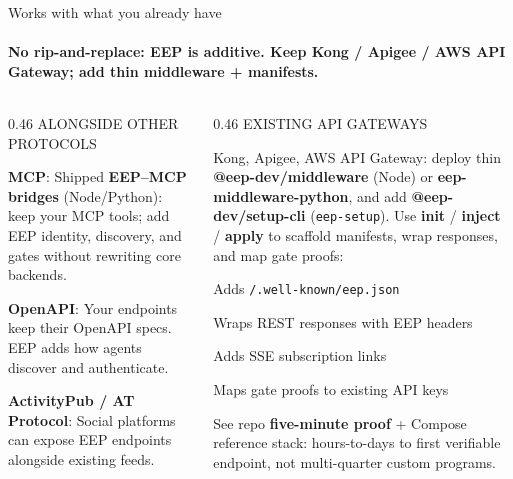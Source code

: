 \documentclass[aspectratio=169,10pt]{beamer}
\newcommand{\cmark}{\textcolor{mint}{\ding{51}}}
\begin{document}
\begin{frame}{Works with what you already have}
\framesubtitle{No rip-and-replace: EEP is \textbf{additive}. Keep Kong / Apigee / AWS API Gateway; add thin middleware + manifests.}

\vspace{0.12cm}

\begin{columns}[T]
\begin{column}{0.46\textwidth}
{\footnotesize\color{accent} ALONGSIDE OTHER PROTOCOLS}\par
\vspace{4pt}
{\footnotesize\color{txtm}%
\textbf{MCP}: Shipped \textbf{EEP--MCP bridges} (Node/Python): keep your MCP tools; add EEP identity, discovery, and gates without rewriting core backends.\par
\vspace{4pt}
\textbf{OpenAPI}: Your endpoints keep their OpenAPI specs. EEP adds how agents discover and authenticate.\par
\vspace{4pt}
\textbf{ActivityPub / AT Protocol}: Social platforms can expose EEP endpoints alongside existing feeds.%
}
\end{column}

\begin{column}{0.46\textwidth}
{\footnotesize\color{cyan} EXISTING API GATEWAYS}\par
\vspace{4pt}
{\footnotesize\color{txtm}%
Kong, Apigee, AWS API Gateway: deploy thin \textbf{@eep-dev/middleware} (Node) or \textbf{eep-middleware-python}, and add \textbf{@eep-dev/setup-cli} (\texttt{eep-setup}). Use \textbf{init} / \textbf{inject} / \textbf{apply} to scaffold manifests, wrap responses, and map gate proofs:\par
\vspace{3pt}
\cmark\; Adds \texttt{/.well-known/eep.json}\par
\vspace{2pt}
\cmark\; Wraps REST responses with EEP headers\par
\vspace{2pt}
\cmark\; Adds SSE subscription links\par
\vspace{2pt}
\cmark\; Maps gate proofs to existing API keys\par
\vspace{5pt}
{\color{slate}See repo \textbf{five-minute proof} + Compose reference stack: hours-to-days to first verifiable endpoint, not multi-quarter custom programs.}%
}
\end{column}
\end{columns}
\end{frame}
\end{document}
